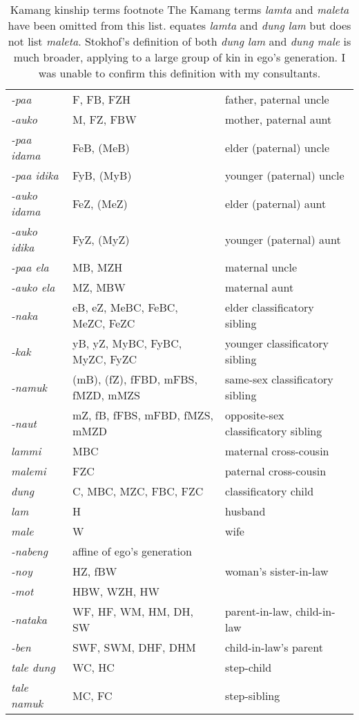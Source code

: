\begin{table}\centering
\begin{tabular}{p{3cm}p{3cm}p{5cm}}
\textit{{}-paa} & F, FB, FZH & father, paternal uncle\\
\textit{{}-auko} & M, FZ, FBW & mother, paternal aunt\\
\textit{{}-paa idama} & FeB, (MeB) & elder (paternal) uncle\\
\textit{{}-paa idika} & FyB, (MyB) & younger (paternal) uncle\\
\textit{{}-auko idama} & FeZ, (MeZ) & elder (paternal) aunt\\
\textit{{}-auko idika} & FyZ, (MyZ) & younger (paternal) aunt\\
\textit{{}-paa ela} & MB, MZH & maternal uncle\\
\textit{{}-auko ela} & MZ, MBW & maternal aunt\\
\textit{{}-naka} & eB, eZ, MeBC, FeBC, MeZC, FeZC & elder classificatory sibling\\
\textit{{}-kak} & yB, yZ, MyBC, FyBC, MyZC, FyZC & younger classificatory sibling\\
\textit{{}-namuk} & (mB), (fZ), fFBD, mFBS, fMZD, mMZS & same-sex classificatory sibling\\
\textit{{}-naut} & mZ, fB, fFBS, mFBD, fMZS, mMZD & opposite-sex classificatory sibling\\
\textit{lammi} & MBC & maternal cross-cousin\\
\textit{malemi} & FZC & paternal cross-cousin\\
\textit{dung} & C, MBC, MZC, FBC, FZC & classificatory child\\
\textit{lam} & H & husband\\
\textit{male} & W & wife\\
\textit{{}-nabeng} & affine of ego's generation & \\
\textit{{}-noy} & HZ, fBW & woman's sister-in-law\\
\textit{{}-mot} & HBW, WZH, HW & \\
\textit{{}-nataka} & WF, HF, WM, HM, DH, SW & parent-in-law, child-in-law\\
\textit{{}-ben} & SWF, SWM, DHF, DHM & child-in-law's parent\\
\textit{tale dung} & WC, HC & step-child\\
\textit{tale namuk} & MC, FC & step-sibling\\
\end{tabular}
\caption{Kamang kinship terms footnote{{ }  The Kamang terms \textit{lamta} and \textit{maleta} have been omitted from this list. \citet{Stokhof1977} equates\textit{ lamta} and \textit{dung lam} but does not list \textit{maleta}. Stokhof's definition of both \textit{dung lam}  and \textit{dung male} is much broader, applying to a large group of kin in ego's generation. I was unable to confirm this definition with my consultants.}}
\end{table}


